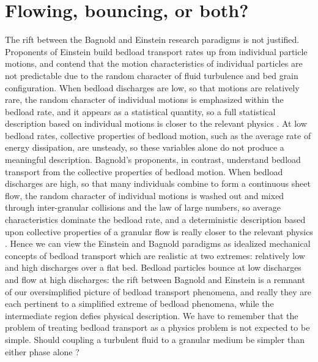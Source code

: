 \documentclass{article}
\begin{document}
\section{Flowing, bouncing, or both?}

The rift between the Bagnold and Einstein research paradigms is not justified. 
Proponents of Einstein build bedload transport rates up from individual particle motions, and contend that the motion characteristics of individual particles are not predictable due to the random character of fluid turbulence and bed grain configuration. 
When bedload discharges are low, so that motions are relatively rare, the random character of individual motions is emphasized within the bedload rate, and it appears as a statistical quantity, so a full statistical description based on individual motions is closer to the relevant physics \citep{Ancey2008, Heyman2013, Ma2014, Heyman2016}.
At low bedload rates, collective properties of bedload motion, such as the average rate of energy dissipation, are unsteady, so these variables alone do not produce a meaningful description. 
Bagnold's proponents, in contrast, understand bedload transport from the collective properties of bedload motion. 
When bedload discharges are high, so that many individuals combine to form a continuous sheet flow, the random character of individual motions is washed out and mixed through inter-granular collisions and the law of large numbers, so average characteristics dominate the bedload rate, and a deterministic description based upon collective properties of a granular flow is really closer to the relevant physics \citep{Jenkins1998, Hsu2004, Mouilleron2009, Frey2011, Houssais2016, Maurin2018}.
Hence we can view the Einstein and Bagnold paradigms as idealized mechanical concepts of bedload transport which are realistic at two extremes: relatively low and high discharges over a flat bed. 
Bedload particles bounce at low discharges and flow at high discharges: the rift between Bagnold and Einstein is a remnant of our oversimplified picture of bedload transport phenomena, and really they are each pertinent to a simplified extreme of bedload phenomena, while the intermediate region defies physical description.  
We have to remember that the problem of treating bedload transport as a physics problem is not expected to be simple.
Should coupling a turbulent fluid to a granular medium be simpler than either phase alone \citep{Pope2000, Baule2016}?
\end{document}

